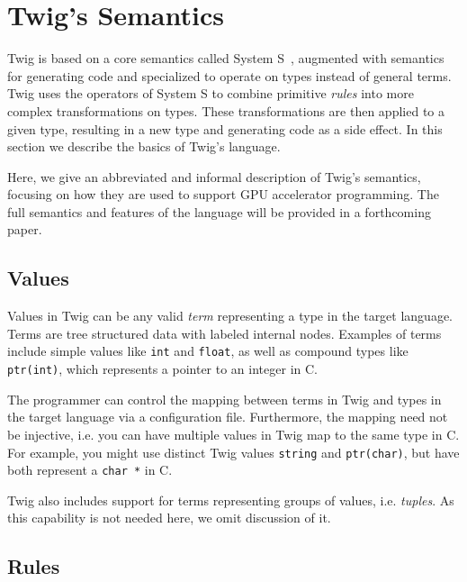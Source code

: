 
\section{Twig's Semantics}
\label{semantics}


Twig is based on a core semantics called System S~\cite{Visser:1998p333},
augmented with semantics for generating code and specialized to operate on types
instead of general terms. Twig uses the operators of System S to combine
primitive \emph{rules} into more complex transformations on types. These
transformations are then applied to a given type, resulting in a new type and
generating code as a side effect. In this section we describe the basics of
Twig's language.

Here, we give an abbreviated and informal description of Twig's semantics,
focusing on how they are used to support GPU accelerator programming. The full
semantics and features of the language will be provided in a forthcoming paper.


\subsection{Values}

Values in Twig can be any valid \emph{term} representing a type in the target
language. Terms are tree structured data with labeled internal nodes. Examples
of terms include simple values like \texttt{int} and \texttt{float}, as well as
compound types like \texttt{ptr(int)}, which represents a pointer to an integer
in C.

The programmer can control the mapping between terms in Twig and types in the
target language via a configuration file. Furthermore, the mapping need not be
injective, i.e. you can have multiple values in Twig map to the same type in C.
For example, you might use distinct Twig values \texttt{string} and
\texttt{ptr(char)}, but have both represent a \texttt{char *} in C.

Twig also includes support for terms representing groups of values, i.e.
\emph{tuples}. As this capability is not needed here, we omit discussion of it.

\subsection{Rules}

